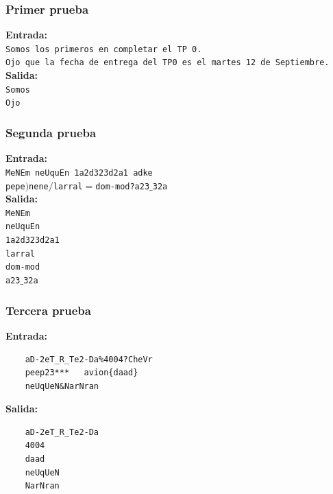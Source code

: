 \documentclass[a4paper, 10pt]{article}
\def\code#1{\texttt{#1}}
\newcommand\tab[1][0.5cm]{\hspace*{#1}}
\begin{document}
			\subsubsection{Primer prueba}
				\textbf{Entrada:}\\
				\tab\tab\code{Somos los primeros en completar el TP 0.}\\
				\tab\tab\code{Ojo que la fecha de entrega del TP0 es el martes 12 de Septiembre.}\\
				\tab\textbf{Salida:}\\
				\tab\tab\code{Somos}\\
				\tab\tab\code{Ojo}
			\subsubsection{Segunda prueba}
				\textbf{Entrada:}\\
				\tab\tab\code{MeNEm neUquEn 1a2d323d2a1 adke}\\
				\tab\tab\code{pepe$)$nene$/$larral$=$dom-mod?a23$\_$32a}\\
				\tab\textbf{Salida:}\\
				\tab\tab\code{MeNEm}\\
				\tab\tab\code{neUquEn}\\
				\tab\tab\code{1a2d323d2a1}\\
				\tab\tab\code{larral}\\
				\tab\tab\code{dom-mod}\\
				\tab\tab\code{a23$\_$32a}
			\subsubsection{Tercera prueba}
				\textbf{Entrada:}
				\begin{lstlisting}
    aD-2eT_R_Te2-Da%4004?CheVr
    peep23***   avion{daad}
    neUqUeN&NarNran
		        	\end{lstlisting}
				\tab\textbf{Salida:}
				\begin{lstlisting}
    aD-2eT_R_Te2-Da
    4004
    daad
    neUqUeN
    NarNran	
		        	\end{lstlisting}
\end{document}
